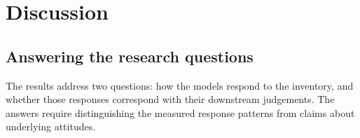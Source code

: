 \chapter{Discussion}\label{ch:discussion}


\section{Answering the research questions}\label{sec:disc-rq}

The results address two questions: how the models respond to the inventory,
and whether those responses correspond with their downstream judgements.
The answers require distinguishing the measured response patterns from claims
about underlying attitudes.

